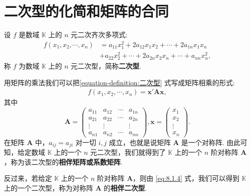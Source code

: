 \documentclass[../../main.tex]{subfiles}%
\begin{document}
\section{二次型的化简和矩阵的合同}

\begin{definition}[二次型]\label{definition:二次型}
设 $f$ 是数域 $\mathbb{K}$ 上的 $n$ 元二次齐次多项式:
\begin{align}\label{equation-definition:二次型}
f(x_1,x_2,\cdots,x_n)&=a_{11}x_1^2 + 2a_{12}x_1x_2+\cdots + 2a_{1n}x_1x_n\\
&+a_{22}x_2^2+\cdots + 2a_{2n}x_2x_n+\cdots + a_{nn}x_n^2,
\end{align}
称 $f$ 为数域 $\mathbb{K}$ 上的 $n$ 元二次型，简称\textbf{二次型}. 
\end{definition}

\begin{definition}[二次型与矩阵的相伴]\label{definition:二次型与矩阵的相伴}
用矩阵的乘法我们可以把\eqref{equation-definition:二次型} 式写成矩阵相乘的形式:
\begin{align}
f(x_1,x_2,\cdots,x_n)=\boldsymbol{x}'\boldsymbol{A}\boldsymbol{x},\label{eq:8.1.4}
\end{align}
其中
\[
\boldsymbol{A}=\begin{pmatrix}
a_{11} & a_{12} & \cdots & a_{1n} \\
a_{21} & a_{22} & \cdots & a_{2n} \\
\vdots & \vdots & & \vdots \\
a_{n1} & a_{n2} & \cdots & a_{nn}
\end{pmatrix}, \boldsymbol{x}=\begin{pmatrix}
x_1 \\
x_2 \\
\vdots \\
x_n
\end{pmatrix}.
\]
在矩阵 $\boldsymbol{A}$ 中，$a_{ij}=a_{ji}$ 对一切 $i,j$ 成立，也就是说矩阵 $\boldsymbol{A}$ 是一个对称阵. 由此可知，给定数域 $\mathbb{K}$ 上的一个 $n$ 元二次型，我们就得到了 $\mathbb{K}$ 上的一个 $n$ 阶对称阵 $\boldsymbol{A}$，称为该二次型的\textbf{相伴矩阵或系数矩阵}.

反过来，若给定 $\mathbb{K}$ 上的一个 $n$ 阶对称阵 $\boldsymbol{A}$，则由 \eqref{eq:8.1.4} 式，我们可以得到 $\mathbb{K}$ 上的一个二次型，称为对称阵 $\boldsymbol{A}$ 的\textbf{相伴二次型}.
\end{definition}
\end{document}
